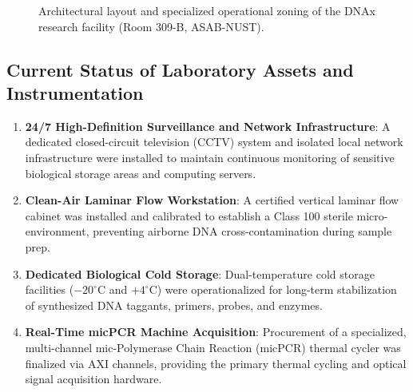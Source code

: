 \begin{figure}[H]
    \caption{Architectural layout and specialized operational zoning of the DNAx research facility (Room 309-B, ASAB-NUST).}
    \label{fig:lab_cad}
\end{figure}

\subsection{Current Status of Laboratory Assets and Instrumentation}
\begin{enumerate}
    \item \textbf{24/7 High-Definition Surveillance and Network Infrastructure}: A dedicated closed-circuit television (CCTV) system and isolated local network infrastructure were installed to maintain continuous monitoring of sensitive biological storage areas and computing servers.
    \item \textbf{Clean-Air Laminar Flow Workstation}: A certified vertical laminar flow cabinet was installed and calibrated to establish a Class 100 sterile micro-environment, preventing airborne DNA cross-contamination during sample prep.
    \item \textbf{Dedicated Biological Cold Storage}: Dual-temperature cold storage facilities ($-20^\circ\text{C}$ and $+4^\circ\text{C}$) were operationalized for long-term stabilization of synthesized DNA taggants, primers, probes, and enzymes.
    \item \textbf{Real-Time micPCR Machine Acquisition}: Procurement of a specialized, multi-channel mic-Polymerase Chain Reaction (micPCR) thermal cycler was finalized via AXI channels, providing the primary thermal cycling and optical signal acquisition hardware.
\end{enumerate}

